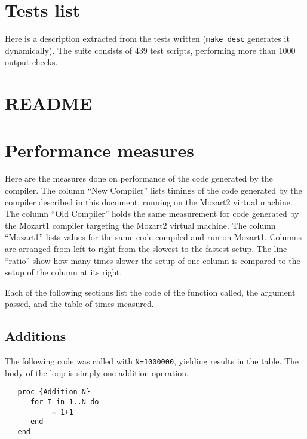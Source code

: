 \documentclass[a4paper]{memoir}
\begin{document}
\begin{appendices}
\chapter{Tests list}
Here is a description extracted from the tests written (\lstinline!make desc!
generates it dynamically).
The suite consists of 439 test scripts, performing more than 1000 output
checks.



\chapter{README}\label{appendix:redame}

\chapter{Performance measures}\label{appendix:performance}
Here are the measures done on performance of the code generated by the compiler.
The column ``New Compiler'' lists timings of the code generated by the compiler
described in this document, running on the Mozart2 virtual machine. The column ``Old
Compiler'' holds the same measurement for code generated by the Mozart1 compiler
targeting the Mozart2 virtual machine. The column ``Mozart1'' lists values for
the same code compiled and run on Mozart1.
Columns are arranged from left to right from the slowest to the fastest setup.
The line ``ratio'' show how many times slower the setup of one column is
compared to the setup of the column at its right.

Each of the following sections list the code of the function called, the
argument passed, and the table of times measured.

\section{Additions}


The following code was called with \lstinline!N=1000000!, yielding results in
the table. The body of the loop is simply one addition operation.

\begin{lstlisting}
   proc {Addition N}
      for I in 1..N do
         _ = 1+1
      end
   end
\end{lstlisting}


\end{appendices}
\end{document}
